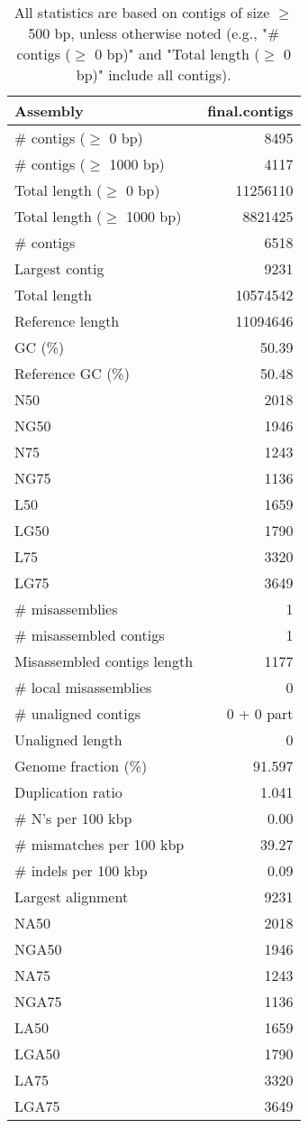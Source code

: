 \documentclass[12pt,a4paper]{article}
\begin{document}
\begin{table}[ht]
\begin{center}
\caption{All statistics are based on contigs of size $\geq$ 500 bp, unless otherwise noted (e.g., "\# contigs ($\geq$ 0 bp)" and "Total length ($\geq$ 0 bp)" include all contigs).}
\begin{tabular}{|l*{1}{|r}|}
\hline
Assembly & final.contigs \\ \hline
\# contigs ($\geq$ 0 bp) & 8495 \\ \hline
\# contigs ($\geq$ 1000 bp) & 4117 \\ \hline
Total length ($\geq$ 0 bp) & 11256110 \\ \hline
Total length ($\geq$ 1000 bp) & 8821425 \\ \hline
\# contigs & 6518 \\ \hline
Largest contig & 9231 \\ \hline
Total length & 10574542 \\ \hline
Reference length & 11094646 \\ \hline
GC (\%) & 50.39 \\ \hline
Reference GC (\%) & 50.48 \\ \hline
N50 & 2018 \\ \hline
NG50 & 1946 \\ \hline
N75 & 1243 \\ \hline
NG75 & 1136 \\ \hline
L50 & 1659 \\ \hline
LG50 & 1790 \\ \hline
L75 & 3320 \\ \hline
LG75 & 3649 \\ \hline
\# misassemblies & 1 \\ \hline
\# misassembled contigs & 1 \\ \hline
Misassembled contigs length & 1177 \\ \hline
\# local misassemblies & 0 \\ \hline
\# unaligned contigs & 0 + 0 part \\ \hline
Unaligned length & 0 \\ \hline
Genome fraction (\%) & 91.597 \\ \hline
Duplication ratio & 1.041 \\ \hline
\# N's per 100 kbp & 0.00 \\ \hline
\# mismatches per 100 kbp & 39.27 \\ \hline
\# indels per 100 kbp & 0.09 \\ \hline
Largest alignment & 9231 \\ \hline
NA50 & 2018 \\ \hline
NGA50 & 1946 \\ \hline
NA75 & 1243 \\ \hline
NGA75 & 1136 \\ \hline
LA50 & 1659 \\ \hline
LGA50 & 1790 \\ \hline
LA75 & 3320 \\ \hline
LGA75 & 3649 \\ \hline
\end{tabular}
\end{center}
\end{table}
\end{document}
